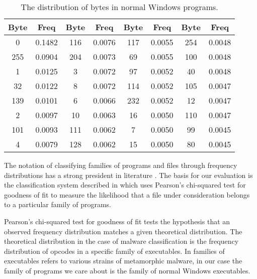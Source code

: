 \documentclass[finalcopy,short]{srpaper}
\begin{document}
        \begin{table}
            \centering
            \begin{tabular}{|c|c||c|c||c|c||c|c|}
                \hline
                Byte & Freq & Byte & Freq & Byte & Freq & Byte & Freq \\
                \hline
                0 & 0.1482 & 116 & 0.0076 & 117 & 0.0055 & 254 & 0.0048 \\
                \hline
                255 & 0.0904 & 204 & 0.0073 & 69 & 0.0055 & 100 & 0.0048 \\
                \hline
                1 & 0.0125 & 3 & 0.0072 & 97 & 0.0052 & 40 & 0.0048 \\
                \hline
                32 & 0.0122 & 8 & 0.0072 & 114 & 0.0052 & 105 & 0.0047 \\
                \hline
                139 & 0.0101 & 6 & 0.0066 & 232 & 0.0052 & 12 & 0.0047 \\
                \hline
                2 & 0.0097 & 10 & 0.0063 & 16 & 0.0050 & 110 & 0.0047 \\
                \hline
                101 & 0.0093 & 111 & 0.0062 & 7 & 0.0050 & 99 & 0.0045 \\
                \hline
                4 & 0.0079 & 128 & 0.0062 & 15 & 0.0050 & 80 & 0.0045 \\
                \hline
            \end{tabular}
            \caption{The distribution of bytes in normal Windows programs.}
            \label{tab:results-windows-dist}
        \end{table}

        The notation of classifying families of programs and files through
        frequency distributions has a strong president in literature
        \cite{chisquared,hmm_evade,stat_model,fileprints}. The basis for our
        evaluation is the classification system described in \cite{chisquared}
        which uses Pearson's chi-squared test for goodness of fit to measure the
        likelihood that a file under consideration belongs to a particular
        family of programs.

        Pearson's chi-squared test for goodness of fit tests the hypothesis that
        an observed frequency distribution matches a given theoretical
        distribution. The theoretical distribution in the case of malware
        classification is the frequency distribution of opcodes in a specific
        family of executables. In \cite{chisquared} families of executables
        refers to various strains of metamorphic malware, in our case the family
        of programs we care about is the family of normal Windows executables.
        
\end{document}
